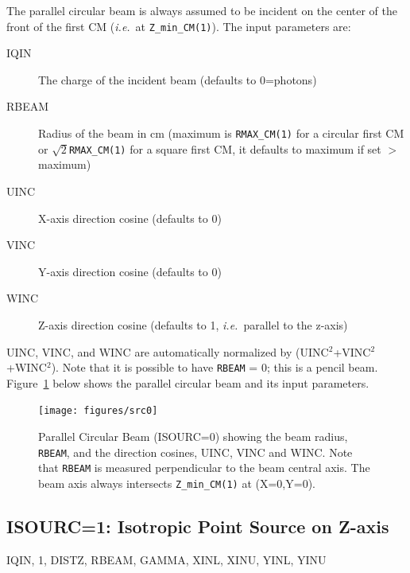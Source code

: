 \documentclass[12pt,twoside]{article}
\newcommand{\cen}[1]{\begin{center} #1 \end{center}                   }
\newcommand{\ie}{{\em i.e.}}
\begin{document}
The parallel circular beam is always assumed to be incident on the
center of the front
of the first CM (\ie\ at \verb+Z_min_CM(1)+).  The input parameters are:
\begin{description}
\item [IQIN] The charge of the incident beam (defaults to 0=photons)
\item [RBEAM] Radius of the beam in cm (maximum is \verb+RMAX_CM(1)+
 for a circular first CM or
$\sqrt{2}$\verb+RMAX_CM(1)+ for a square first CM,
it defaults to maximum if set $>$
maximum)
\item [UINC] X-axis direction cosine (defaults to 0)
\item [VINC] Y-axis direction cosine (defaults to 0)
\item [WINC] Z-axis direction cosine (defaults to 1, \ie\ parallel to
the z-axis)
\end{description}
UINC, VINC, and WINC are automatically normalized by
(UINC$^2$+VINC$^2$+WINC$^2$).
Note that it is possible to have \verb+RBEAM+ = 0; this is a pencil beam.
Figure~\ref{fig_src0} below shows the parallel circular beam and its input parameters.
\begin{figure}[htbp]
\begin{center}
\leavevmode
\mbox{}\hspace{0cm}
\texttt{[image: figures/src0]}
\caption[ISOURC=0: Parallel circular beam.]
{Parallel Circular Beam (ISOURC=0) showing the beam radius,
{\tt RBEAM}, and the
direction cosines, UINC, VINC and WINC.  Note that {\tt RBEAM} is measured perpendicular
to the beam central axis.  The beam axis always intersects {\tt Z\_min\_CM(1)}
 at (X=0,Y=0).}
\label{fig_src0}
\end{center}
\end{figure}

\clearpage
\vspace*{-2cm}
\subsection{ISOURC=1: Isotropic Point Source on Z-axis}
\vspace*{-0.2cm}
\cen{IQIN, 1, DISTZ, RBEAM, GAMMA, XINL, XINU, YINL, YINU}
\end{document}
